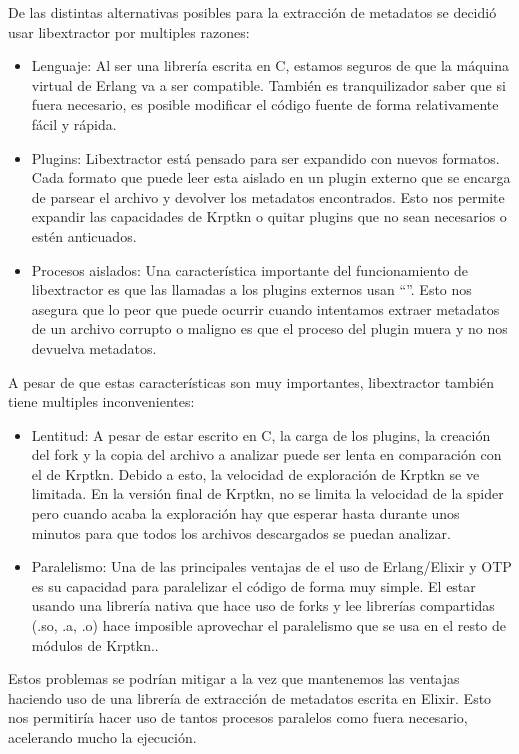 De las distintas alternativas posibles para la extracción de metadatos se decidió usar libextractor por multiples razones:

\begin{itemize}
  \item Lenguaje: Al ser una librería escrita en C, estamos seguros de que la máquina virtual de Erlang va a ser compatible. También es tranquilizador saber que si fuera necesario, es posible modificar el código fuente de forma relativamente fácil y rápida.
  \item Plugins: Libextractor está pensado para ser expandido con nuevos formatos. Cada formato que puede leer esta aislado en un plugin externo que se encarga de parsear el archivo y devolver los metadatos encontrados. Esto nos permite expandir las capacidades de Krptkn o quitar plugins que no sean necesarios o estén anticuados.
  \item Procesos aislados: Una característica importante del funcionamiento de libextractor es que las llamadas a los plugins externos usan ``''. Esto nos asegura que lo peor que puede ocurrir cuando intentamos extraer metadatos de un archivo corrupto o maligno es que el proceso del plugin muera y no nos devuelva metadatos. 
\end{itemize}

A pesar de que estas características son muy importantes, libextractor también tiene multiples inconvenientes:
\begin{itemize}
  \item Lentitud: A pesar de estar escrito en C, la carga de los plugins, la creación del fork y la copia del archivo a analizar puede ser lenta en comparación con el  de Krptkn. Debido a esto, la velocidad de exploración de Krptkn se ve limitada. En la versión final de Krptkn, no se limita la velocidad de la spider pero cuando acaba la exploración hay que esperar hasta durante unos minutos para que todos los archivos descargados se puedan analizar.
  \item Paralelismo: Una de las principales ventajas de el uso de Erlang/Elixir y OTP es su capacidad para paralelizar el código de forma muy simple. El estar usando una librería nativa que hace uso de forks y lee librerías compartidas (.so, .a, .o) hace imposible aprovechar el paralelismo que se usa en el resto de módulos de Krptkn..
\end{itemize}

Estos problemas se podrían mitigar a la vez que mantenemos las ventajas haciendo uso de una librería de extracción de metadatos escrita en Elixir. Esto nos permitiría hacer uso de tantos procesos paralelos como fuera necesario, acelerando mucho la ejecución.


